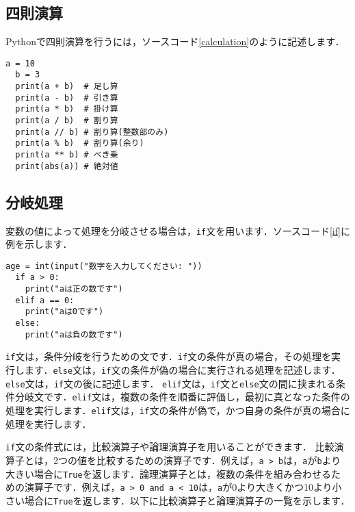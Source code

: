 \documentclass{jarticle}
\begin{document}
\subsection{四則演算}
Pythonで四則演算を行うには，ソースコード\ref{calculation}のように記述します．
\begin{lstlisting}[caption=四則演算,label=calculation]
  a = 10
  b = 3
  print(a + b)  # 足し算
  print(a - b)  # 引き算
  print(a * b)  # 掛け算
  print(a / b)  # 割り算
  print(a // b) # 割り算(整数部のみ)
  print(a % b)  # 割り算(余り)
  print(a ** b) # べき乗
  print(abs(a)) # 絶対値
\end{lstlisting}

\subsection{分岐処理}
変数の値によって処理を分岐させる場合は，\texttt{if}文を用います．ソースコード\ref{if}に例を示します．
\begin{lstlisting}[caption=if文,label=if]
  age = int(input("数字を入力してください: "))
  if a > 0:
    print("aは正の数です")
  elif a == 0:
    print("aは0です")
  else:
    print("aは負の数です")
\end{lstlisting}

\texttt{if}文は，条件分岐を行うための文です．\texttt{if}文の条件が真の場合，その処理を実行します．\texttt{else}文は，\texttt{if}文の条件が偽の場合に実行される処理を記述します．\texttt{else}文は，\texttt{if}文の後に記述します．
\texttt{elif}文は，\texttt{if}文と\texttt{else}文の間に挟まれる条件分岐文です．\texttt{elif}文は，複数の条件を順番に評価し，最初に真となった条件の処理を実行します．\texttt{elif}文は，\texttt{if}文の条件が偽で，かつ自身の条件が真の場合に処理を実行します．

\texttt{if}文の条件式には，比較演算子や論理演算子を用いることができます．
比較演算子とは，2つの値を比較するための演算子です．例えば，\texttt{a > b}は，\texttt{a}が\texttt{b}より大きい場合に\texttt{True}を返します．論理演算子とは，複数の条件を組み合わせるための演算子です．例えば，\texttt{a > 0 and a < 10}は，\texttt{a}が0より大きくかつ10より小さい場合に\texttt{True}を返します．以下に比較演算子と論理演算子の一覧を示します．
\end{document}

